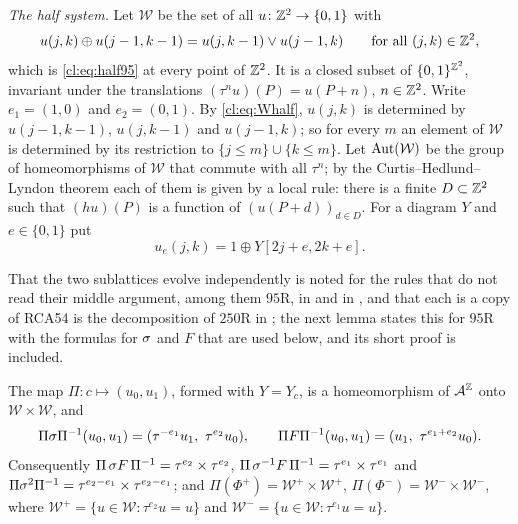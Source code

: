 \emph{The half system.} Let $\mathcal W$ be the set of all $u\colon\mathbb{Z}^2\to\{0,1\}$ with
\begin{equation}\label{cl:eq:Whalf}
u(j,k)\oplus u(j-1,k-1)=u(j,k-1)\vee u(j-1,k)\qquad\text{for all }(j,k)\in\mathbb{Z}^2 ,
\end{equation}
which is \eqref{cl:eq:half95} at every point of $\mathbb{Z}^2$. It is a closed subset of $\{0,1\}^{\mathbb{Z}^2}$, invariant under the translations $(\tau^nu)(P)=u(P+n)$, $n\in\mathbb{Z}^2$. Write $e_1=(1,0)$ and $e_2=(0,1)$. By \eqref{cl:eq:Whalf}, $u(j,k)$ is determined by $u(j-1,k-1)$, $u(j,k-1)$ and $u(j-1,k)$; so for every $m$ an element of $\mathcal W$ is determined by its restriction to $\{j\le m\}\cup\{k\le m\}$. Let $\operatorname{Aut}(\mathcal W)$ be the group of homeomorphisms of $\mathcal W$ that commute with all $\tau^n$; by the Curtis--Hedlund--Lyndon theorem each of them is given by a local rule: there is a finite $D\subset\mathbb{Z}^2$ such that $(hu)(P)$ is a function of $(u(P+d))_{d\in D}$. For a diagram $Y$ and $e\in\{0,1\}$ put
\[
u_e(j,k)=1\oplus Y[2j+e,2k+e].
\]

That the two sublattices evolve independently is noted for the rules that do not read their middle argument, among them $95$R, in \cite[p.~386]{Takesue1989} and in \cite[Section~4]{Takesue1995}, and that each is a copy of RCA54 is the decomposition of $250$R in \cite[Section~3.1]{IT2018}; the next lemma states this for $95$R with the formulas for $\sigma$ and $F$ that are used below, and its short proof is included.

\begin{lemma}\label{cl:lem:95split}
The map $\Pi\colon c\mapsto(u_0,u_1)$, formed with $Y=Y_c$, is a homeomorphism of $\mathcal{A}^{\mathbb{Z}}$ onto $\mathcal W\times\mathcal W$, and
\[
\Pi\sh\Pi^{-1}(u_0,u_1)=(\tau^{-e_1}u_1,\ \tau^{e_2}u_0),\qquad
\Pi F\Pi^{-1}(u_0,u_1)=(u_1,\ \tau^{e_1+e_2}u_0).
\]
Consequently $\Pi\,\sigma F\,\Pi^{-1}=\tau^{e_2}\times\tau^{e_2}$, $\Pi\,\sigma^{-1}F\,\Pi^{-1}=\tau^{e_1}\times\tau^{e_1}$ and $\Pi\sigma^2\Pi^{-1}=\tau^{e_2-e_1}\times\tau^{e_2-e_1}$; and $\Pi(\Phi^+)=\mathcal W^+\times\mathcal W^+$, $\Pi(\Phi^-)=\mathcal W^-\times\mathcal W^-$, where $\mathcal W^+=\{u\in\mathcal W:\tau^{e_2}u=u\}$ and $\mathcal W^-=\{u\in\mathcal W:\tau^{e_1}u=u\}$.
\end{lemma}

